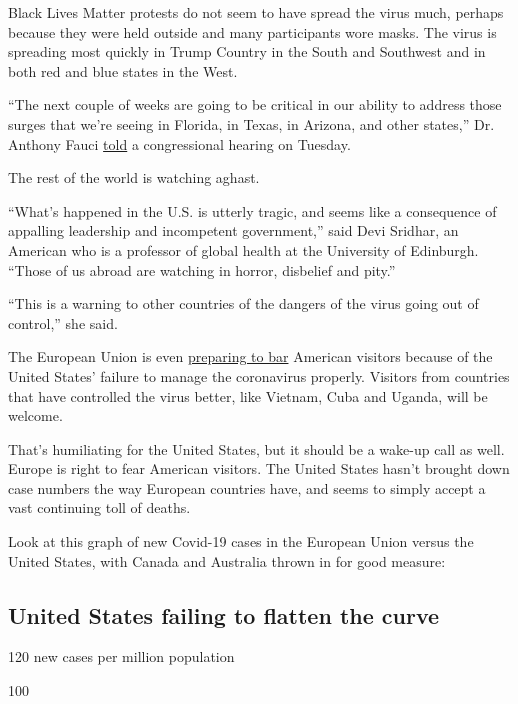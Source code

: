 Black Lives Matter protests do not seem to have spread the virus much,
perhaps because they were held outside and many participants wore masks.
The virus is spreading most quickly in Trump Country in the South and
Southwest and in both red and blue states in the West.

``The next couple of weeks are going to be critical in our ability to
address those surges that we're seeing in Florida, in Texas, in Arizona,
and other states,'' Dr. Anthony Fauci
\href{https://www.nytimes3xbfgragh.onion/2020/06/23/us/politics/fauci-congress-coronavirus.html}{told}
a congressional hearing on Tuesday.

The rest of the world is watching aghast.

``What's happened in the U.S. is utterly tragic, and seems like a
consequence of appalling leadership and incompetent government,'' said
Devi Sridhar, an American who is a professor of global health at the
University of Edinburgh. ``Those of us abroad are watching in horror,
disbelief and pity.''

``This is a warning to other countries of the dangers of the virus going
out of control,'' she said.

The European Union is even
\href{https://www.nytimes3xbfgragh.onion/2020/06/23/world/europe/coronavirus-EU-American-travel-ban.html}{preparing
to bar} American visitors because of the United States' failure to
manage the coronavirus properly. Visitors from countries that have
controlled the virus better, like Vietnam, Cuba and Uganda, will be
welcome.

That's humiliating for the United States, but it should be a wake-up
call as well. Europe is right to fear American visitors. The United
States hasn't brought down case numbers the way European countries have,
and seems to simply accept a vast continuing toll of deaths.

Look at this graph of new Covid-19 cases in the European Union versus
the United States, with Canada and Australia thrown in for good measure:

\hypertarget{united-states-failing-to-flatten-the-curve}{%
\subsection{United States failing to flatten the
curve}\label{united-states-failing-to-flatten-the-curve}}

120 new cases per million population

100

